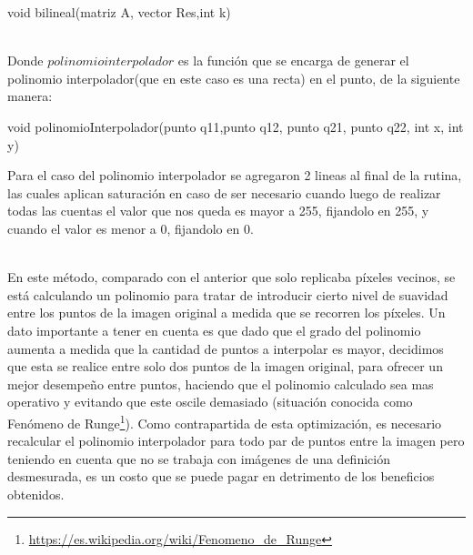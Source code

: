 \begin{algorithm}
\begin{algorithmic}[H]\parskip=1mm
\caption{void bilineal(matriz A, vector Res,int k)}
\end{algorithmic}
\end{algorithm}\\
Donde $polinomio interpolador$ es la función que se encarga de generar el polinomio interpolador(que en este caso es una recta) en el punto, de la siguiente manera:
\newpage
\begin{algorithm}
\begin{algorithmic}[H]\parskip=1mm
\caption{void polinomioInterpolador(punto q11,punto q12, punto q21, punto q22, int x, int y)}
\end{algorithmic}
\end{algorithm}
Para el caso del polinomio interpolador se agregaron 2 lineas al final de la rutina, las cuales aplican saturación en caso de ser necesario cuando luego de realizar todas las cuentas el valor que nos queda es mayor a 255, fijandolo en 255, y cuando el valor es menor a 0, fijandolo en 0.

\\
En este método, comparado con el anterior que solo replicaba píxeles vecinos, se está calculando un polinomio para tratar de introducir cierto nivel de suavidad entre los puntos de la imagen original a medida que se recorren los píxeles. Un dato importante a tener en cuenta es que dado que el grado del polinomio aumenta a medida que la cantidad de puntos a interpolar es mayor, decidimos que esta se realice entre solo dos puntos de la imagen original, para ofrecer un mejor desempe\~no entre puntos, haciendo que el polinomio calculado sea mas operativo y evitando que este oscile demasiado (situación conocida como Fenómeno de Runge\footnote{\url{https://es.wikipedia.org/wiki/Fenomeno_de_Runge}}). Como contrapartida de esta optimización, es necesario recalcular el polinomio interpolador para todo par de puntos entre la imagen pero teniendo en cuenta que no se trabaja con imágenes de una definición desmesurada, es un costo que se puede pagar en detrimento de los beneficios obtenidos.


